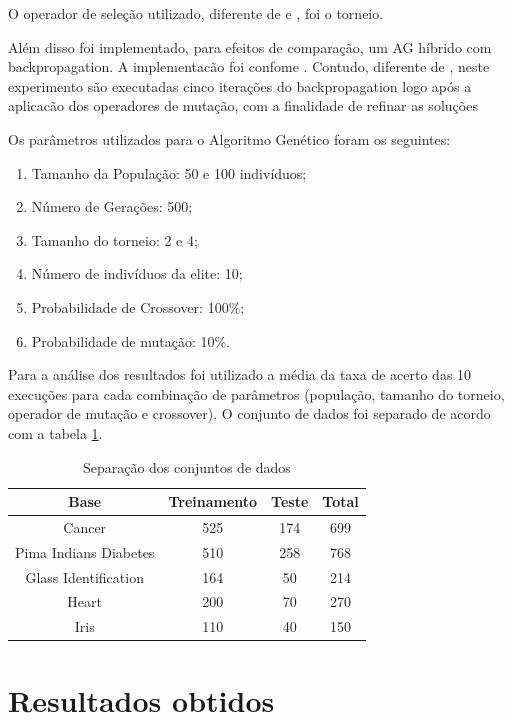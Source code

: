 \documentclass[12pt]{article}
\begin{document}
\par O operador de seleção utilizado, diferente de \cite{Liu} e \cite{montana}, foi o torneio. 


\par Além disso foi implementado, para efeitos de comparação, um AG híbrido com backpropagation. A implementacão foi confome \cite{freeman}. Contudo, diferente de \cite{Liu}, neste experimento são executadas cinco iterações do backpropagation logo após a aplicacão dos operadores de mutação, com a finalidade de refinar as soluções 

\par Os parâmetros utilizados para o Algoritmo Genético foram os seguintes:
\begin{enumerate}
	\item Tamanho da População: 50 e 100 indivíduos;
	\item Número de Gerações: 500;
	\item Tamanho do torneio: 2 e 4;
	\item Número de indivíduos da elite: 10;
	\item Probabilidade de Crossover: 100\%;
	\item Probabilidade de mutação: 10\%.
\end{enumerate}

\par Para a análise dos resultados foi utilizado a média da taxa de acerto das 10 execuções para cada combinação de parâmetros (população, tamanho do torneio, operador de mutação e crossover). O conjunto de dados foi separado de acordo com a tabela \ref{tab:db}.

\begin{table}
\center
\begin{tabular}{|c|c|c|c|}
\hline Base & Treinamento & Teste  & Total \\ 
\hline Cancer & 525 & 174 & 699 \\ 
\hline Pima Indians Diabetes & 510 & 258 & 768 \\ 
\hline Glass Identification & 164 & 50 & 214 \\ 
\hline Heart & 200 & 70 & 270 \\ 
\hline Iris & 110 & 40 & 150 \\ 
\hline 
\end{tabular} 
\caption{Separação dos conjuntos de dados}
\label{tab:db}
\end{table}


\section{Resultados obtidos}
\end{document}
